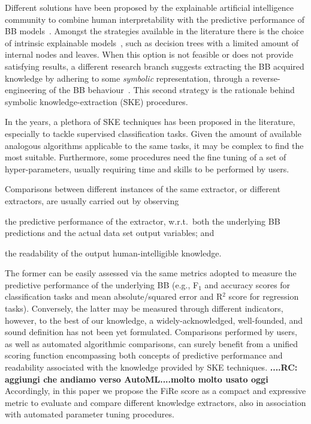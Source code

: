 \documentclass{article}
\newcommand{\fire}{FiRe}
\newenvironment{inlinelist}{\begin{enumerate*}[label=\emph{(\roman{*})}]}{\end{enumerate*}}
\begin{document}
Different solutions have been proposed by the explainable artificial intelligence community to combine human interpretability with the predictive performance of BB models~\cite{guidotti2018survey}.
%
Amongst the strategies available in the literature there is the choice of intrinsic explainable models~\cite{Rudin2019}, such as decision trees with a limited amount of internal nodes and leaves.
%
When this option is not feasible or does not provide satisfying results, a different research branch suggests extracting the BB acquired knowledge by adhering to some \emph{symbolic} representation, through a reverse-engineering of the BB behaviour~\cite{KENNY2021103459}.
%
This second strategy is the rationale behind symbolic knowledge-extraction (SKE) procedures.

In the years, a plethora of SKE techniques has been proposed in the literature, especially to tackle supervised classification tasks.
%
Given the amount of available analogous algorithms applicable to the same tasks, it may be complex to find the most suitable.
%
Furthermore, some procedures need the fine tuning of a set of hyper-parameters, usually requiring time and skills to be performed by users.

Comparisons between different instances of the same extractor, or different extractors, are usually carried out by observing
%
\begin{inlinelist}
	\item the predictive performance of the extractor, w.r.t.\ both the underlying BB predictions and the actual data set output variables; and
	\item the readability of the output human-intelligible knowledge.
\end{inlinelist}

The former can be easily assessed via the same metrics adopted to measure the predictive performance of the underlying BB (e.g., F$_1$ and accuracy scores for classification tasks and mean absolute/squared error and R$^2$ score for regression tasks).
%
Conversely, the latter may be measured through different indicators, however, to the best of our knowledge, a widely-acknowledged, well-founded, and sound definition has not been yet formulated.
%
Comparisons performed by users, as well as automated algorithmic comparisons, can surely benefit from a unified scoring function encompassing both concepts of predictive performance and readability associated with the knowledge provided by SKE techniques.
%
\textbf{....RC: aggiungi che andiamo verso AutoML....molto molto usato oggi}
%
Accordingly, in this paper we propose the \fire{} score as a compact and expressive metric to evaluate and compare different knowledge extractors, also in association with automated parameter tuning procedures.
\end{document}
